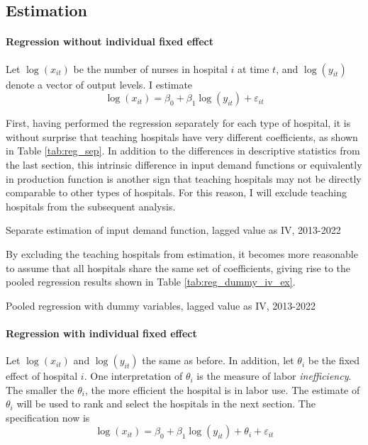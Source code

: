 \documentclass[12pt]{article}
\begin{document}
\subsection{Estimation}

\paragraph{Regression without individual fixed effect}

Let $\log(x_{it})$ be the number of nurses in hospital $i$ at time $t$, and
$\log(y_{it})$ denote a vector of output levels. I estimate
\begin{equation}
    \log(x_{it}) = \beta_0 + \beta_1 \log(y_{it}) + \varepsilon_{it}
\end{equation}

First, having performed the regression separately for each type of hospital, it
is without surprise that teaching hospitals have very different coefficients,
as shown in Table \ref{tab:reg_sep}. In addition to the differences in
descriptive statistics from the last section, this intrinsic difference in
input demand functions or equivalently in production function is another sign
that teaching hospitals may not be directly comparable to other types of
hospitals. For this reason, I will exclude teaching hospitals from the
subsequent analysis.

\begin{table}
    \centering
    
    \caption{Separate estimation of input demand function, lagged value as IV, 2013-2022}
    \label{tab:reg_sep}
\end{table}

By excluding the teaching hospitals from estimation, it becomes more reasonable
to assume that all hospitals share the same set of coefficients, giving rise to
the pooled regression results shown in Table \ref{tab:reg_dummy_iv_ex}.
\begin{table}
    \centering
    
    \caption{Pooled regression with dummy variables, lagged value as IV, 2013-2022}
    \label{tab:reg_dummy_iv_ex}
\end{table}

\paragraph{Regression with individual fixed effect}

Let $\log(x_{it})$ and $\log(y_{it})$ the same as before. In addition, let
$\theta_i$ be the fixed effect of hospital $i$. One interpretation of
$\theta_i$ is the measure of labor \emph{inefficiency}. The smaller the
$\theta_i$, the more efficient the hospital is in labor use. The estimate of
$\theta_i$ will be used to rank and select the hospitals in the next section.
The specification now is
\begin{equation}
    \log(x_{it}) = \beta_0 + \beta_1 \log(y_{it}) + \theta_i+ \varepsilon_{it}
\end{equation}
\end{document}
